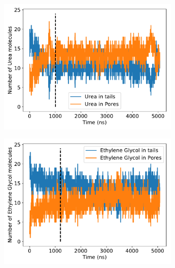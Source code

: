 \documentclass{article}
\begin{document}
  \begin{figure}[hb]
  \centering
  \begin{subfigure}{0.45\textwidth}
  \includegraphics[width=\textwidth]{URE_equilibration.pdf}
  \caption{}\label{fig:URE_equilibration}
  \end{subfigure}
  \begin{subfigure}{0.45\textwidth}
  \includegraphics[width=\textwidth]{GCL_equilibration.pdf}
  \caption{}\label{fig:GCL_equilibration}
  \end{subfigure}
  \begin{subfigure}{0.45\textwidth}

\end{subfigure}
\end{figure}
\end{document}
